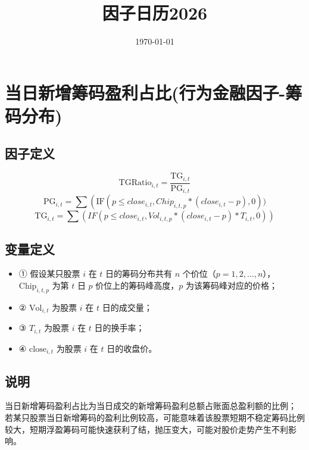 \documentclass{article}
\title{因子日历2026}
\date{\today}
\begin{document}
\maketitle

\section{当日新增筹码盈利占比(行为金融因子-筹码分布)}

\subsection{因子定义}
\begin{equation}
    \mathrm{TGRatio}_{i,t} = \frac{\mathrm{TG}_{i,t}}{\mathrm{PG}_{i,t}}
\end{equation}
\begin{equation}
    \mathrm{PG}_{i,t} = \sum \left( \mathrm{IF}(p\leq close_{i,t},Chip_{i,t,p}* (close_{i,t}-p),0))
\end{equation}
\begin{equation}
    \mathrm{TG}_{i,t} = \sum (IF(p \leq close_{i,t},Vol_{i,t,p}*(close_{i,t}-p)*T_{i,t},0))
\end{equation}

\subsection{变量定义}
\begin{itemize}
    \item ① 假设某只股票 \( i \) 在 \( t \) 日的筹码分布共有 \( n \) 个价位（\( p = 1, 2, \ldots, n \)），\( \mathrm{Chip}_{i,t,p} \) 为第 \( t \) 日 \( p \) 价位上的筹码峰高度，\( p \) 为该筹码峰对应的价格；
    \item ② \( \mathrm{Vol}_{i,t} \) 为股票 \( i \) 在 \( t \) 日的成交量；
    \item ③ \( T_{i,t} \) 为股票 \( i \) 在 \( t \) 日的换手率；
    \item ④ \( \mathrm{close}_{i,t} \) 为股票 \( i \) 在 \( t \) 日的收盘价。
\end{itemize}

\subsection{说明}
当日新增筹码盈利占比为当日成交的新增筹码盈利总额占账面总盈利额的比例；  
若某只股票当日新增筹码的盈利比例较高，可能意味着该股票短期不稳定筹码比例较大，短期浮盈筹码可能快速获利了结，抛压变大，可能对股价走势产生不利影响。
\end{document}
